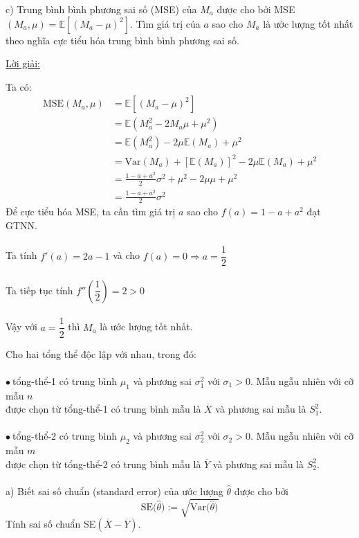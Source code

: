 \documentclass[10pt, a4paper]{article}
\begin{document}
\vspace{2mm}
\begin{tcolorbox}[enhanced,colback=blue!5!white,colframe=blue!75!black,sharp corners=all,shadow={0mm}{0mm}{-1.5mm}%
{fill=blue!75!red,opacity=0.3}]
\color{red}c) \color{black}Trung bình bình phương sai số (MSE) của $M_a$ được cho bởi MSE$(M_a,\mu)=\mathbb E\left[(M_a-\mu)^2\right]$. Tìm giá trị của $a$ sao cho $M_a$ là ước lượng tốt nhất theo nghĩa cực tiểu hóa trung bình bình phương sai số.
\end{tcolorbox}
\begin{center}
	\color{blue}\underline{Lời giải:}
\end{center}
Ta có: \begin{align*}
	\text{MSE}(M_a,\mu)&=\mathbb E\left[(M_a-\mu)^2\right]\\
	&=\mathbb E\left(M_a^2-2M_a\mu+\mu^2\right)\\
	&=\mathbb E(M_a^2)-2\mu\mathbb E(M_a)+\mu^2\\
	&=\text{Var}(M_a)+[\mathbb E(M_a)]^2-2\mu\mathbb E(M_a)+\mu^2\\
	&=\frac{1-a+a^2}{2}\sigma^2+\mu^2-2\mu\mu+\mu^2\\
	&=\frac{1-a+a^2}{2}\sigma^2
\end{align*}
Để cực tiểu hóa MSE, ta cần tìm giá trị $a$ sao cho $f(a)=1-a+a^2$ đạt GTNN.\\\\
Ta tính $f'(a)=2a-1$ và cho $f(a)=0\Rightarrow a=\dfrac12$\\\\
Ta tiếp tục tính $f''\left(\dfrac12\right)=2>0$\\\\
Vậy với $a=\dfrac12$ thì $M_a$ là ước lượng tốt nhất.
\vspace{2mm}
\begin{tcolorbox}[enhanced,colback=blue!5!white,colframe=blue!75!black,sharp corners=all,shadow={0mm}{0mm}{-1.5mm}%
{fill=blue!75!red,opacity=0.3},title=\textbf{Bài 6}]
Cho hai tổng thể độc lập với nhau, trong đó:\\\\
$\bullet~$tổng-thể-1 có trung bình $\mu_1$ và phương sai $\sigma_1^2$ với $\sigma_1>0$. Mẫu ngẫu nhiên với cỡ mẫu $n$\\ được chọn từ tổng-thể-1 có trung bình mẫu là $\overline X$ và phương sai mẫu là $S_1^2$.\\\\
$\bullet~$tổng-thể-2 có trung bình $\mu_2$ và phương sai $\sigma_2^2$ với $\sigma_2>0$. Mẫu ngẫu nhiên với cỡ mẫu $m$\\ được chọn từ tổng-thể-2 có trung bình mẫu là $\overline Y$ và phương sai mẫu là $S_2^2$.\\\\
\color{red}a) \color{black}Biết sai số chuẩn (standard error) của ước lượng $\hat\theta$ được cho bởi $$\text{SE}\big(\widehat\theta\big):=\sqrt{\text{Var}\big(\widehat\theta\big)}$$ Tính sai số chuẩn SE$(\overline X-\overline Y)$.
\end{tcolorbox}
\end{document}
